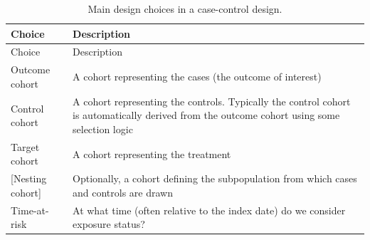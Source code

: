 \documentclass[11pt]{book}
\theoremstyle{definition}
\theoremstyle{definition}
\theoremstyle{definition}
\theoremstyle{remark}
\begin{document}
\begin{longtable}[]{@{}ll@{}}
\caption{\label{tab:ccChoices} Main design choices in a case-control design.}\tabularnewline
\toprule
\begin{minipage}[b]{0.22\columnwidth}\raggedright
Choice\strut
\end{minipage} & \begin{minipage}[b]{0.72\columnwidth}\raggedright
Description\strut
\end{minipage}\tabularnewline
\midrule
\endfirsthead
\toprule
\begin{minipage}[b]{0.22\columnwidth}\raggedright
Choice\strut
\end{minipage} & \begin{minipage}[b]{0.72\columnwidth}\raggedright
Description\strut
\end{minipage}\tabularnewline
\midrule
\endhead
\begin{minipage}[t]{0.22\columnwidth}\raggedright
Outcome cohort\strut
\end{minipage} & \begin{minipage}[t]{0.72\columnwidth}\raggedright
A cohort representing the cases (the outcome of interest)\strut
\end{minipage}\tabularnewline
\begin{minipage}[t]{0.22\columnwidth}\raggedright
Control cohort\strut
\end{minipage} & \begin{minipage}[t]{0.72\columnwidth}\raggedright
A cohort representing the controls. Typically the control cohort is automatically derived from the outcome cohort using some selection logic\strut
\end{minipage}\tabularnewline
\begin{minipage}[t]{0.22\columnwidth}\raggedright
Target cohort\strut
\end{minipage} & \begin{minipage}[t]{0.72\columnwidth}\raggedright
A cohort representing the treatment\strut
\end{minipage}\tabularnewline
\begin{minipage}[t]{0.22\columnwidth}\raggedright
{[}Nesting cohort{]}\strut
\end{minipage} & \begin{minipage}[t]{0.72\columnwidth}\raggedright
Optionally, a cohort defining the subpopulation from which cases and controls are drawn\strut
\end{minipage}\tabularnewline
\begin{minipage}[t]{0.22\columnwidth}\raggedright
Time-at-risk\strut
\end{minipage} & \begin{minipage}[t]{0.72\columnwidth}\raggedright
At what time (often relative to the index date) do we consider exposure status?\strut
\end{minipage}\tabularnewline
\bottomrule
\end{longtable}
\end{document}
